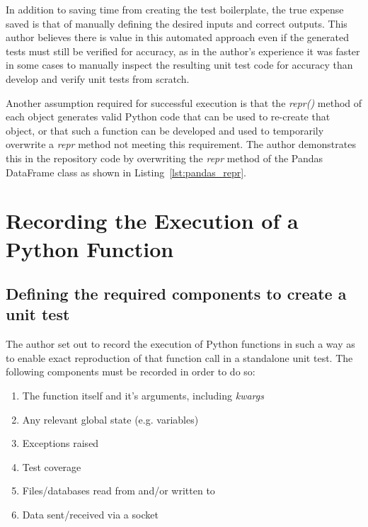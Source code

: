 \documentclass[10pt, conference]{IEEEtran}
\begin{document}
In addition to saving time from creating the test
boilerplate, the true expense saved is that of manually defining the desired
inputs and correct outputs.  This author believes there is value in this automated
approach even if the generated tests must still be verified for accuracy,
as in the author's experience it was faster in some cases to manually inspect 
the resulting unit test code for accuracy than develop and verify unit tests from scratch.

Another assumption required for successful execution is that the \textit{repr()} method
of each object generates valid Python code that can be used to re-create that
object, or that such a function can be developed and used to temporarily
overwrite a \textit{repr\(\)} method not meeting this requirement.  The author demonstrates
this in the repository code by overwriting the \textit{repr\(\)} method of the
Pandas DataFrame class as shown in Listing~\ref{lst:pandas_repr}.


 \section{Recording the Execution of a Python Function}\label{sec:approach}

\subsection{Defining the required components to create a unit test}\label{sec:intro-1}

The author set out to record the execution of Python functions
in such a way as to enable exact reproduction of that 
function call in a standalone unit test.  The following components
must be recorded in order to do so:
\begin{enumerate}
  \item The function itself and it's arguments, including \textit{kwargs}
  \item Any relevant global state (e.g. variables)
  \item Exceptions raised
  \item Test coverage
  \item Files/databases read from and/or written to
  \item Data sent/received via a socket
\end{enumerate}
\end{document}
